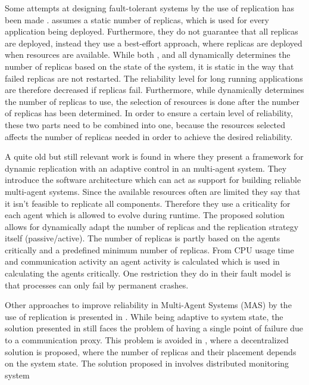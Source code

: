 \documentclass{cslthse-msc}
\begin{document}
Some attempts at designing fault-tolerant systems by the use of replication has been made \cite{designFaultTolerantSched}  \cite{evalReplicationSched} \cite{taskSchedulingReplication} \cite{effTaskReplMobGrid} \cite{relGridServicePredConstraint}. \cite{evalReplicationSched} assumes a static number of replicas, which is used for every application being deployed. Furthermore, they do not guarantee that all replicas are deployed, instead they use a best-effort approach, where replicas are deployed when resources are available. While both \cite{effTaskReplMobGrid}, \cite{taskSchedulingReplication} and \cite{designFaultTolerantSched} all dynamically determines the number of replicas based on the state of the system, it is static in the way that failed replicas are not restarted. The reliability level for long running applications are therefore decreased if replicas fail. Furthermore, while  \cite{designFaultTolerantSched} dynamically determines the number of replicas to use, the selection of resources is done after the number of replicas has been determined. In order to ensure a certain level of reliability, these two parts need to be combined into one, because the resources selected affects the number of replicas needed in order to achieve the desired reliability.

A quite old but still relevant work is found in \cite{dynAdaptRepl} where they present a framework for dynamic replication with an adaptive control in an multi-agent system. They introduce the software architecture which can act as support for building reliable multi-agent systems. Since the available resources often are limited they say that it isn't feasible to replicate all components. Therefore they use a criticality for each agent which is allowed to evolve during runtime. The proposed solution allows for dynamically adapt the number of replicas and the replication strategy itself (passive/active). The number of replicas is partly based on the agents critically and a predefined minimum number of replicas. From CPU usage time and communication activity an agent activity is calculated which is used in calculating the agents critically. One restriction they do in their fault model is that processes can only fail by permanent crashes. %

Other approaches to improve reliability in Multi-Agent Systems (MAS) by the use of replication is presented in \cite{replicatingAgents} \cite{adaptiveMASReplication} \cite{adaptiveAgentReplication}. While being adaptive to system state, the solution presented in \cite{replicatingAgents} still faces the problem of having a single point of failure due to a communication proxy. This problem is avoided in \cite{adaptiveMASReplication}, where a decentralized solution is proposed, where the number of replicas and their placement depends on the system state. %
The solution proposed in \cite{adaptiveAgentReplication} involves distributed monitoring system  %
\end{document}
